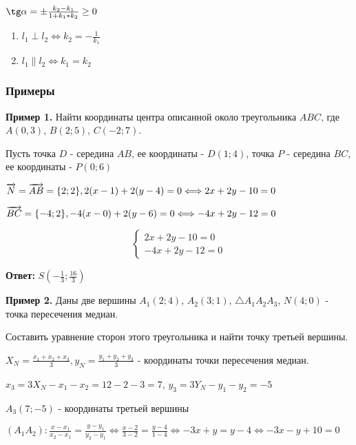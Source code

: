 \documentclass{article}
\def\vec{\ensuremath\overrightarrow}
\begin{document}
\begin{flushleft}
$\tg \alpha = \pm \frac{k_2 - k_1}{1 + k_1 * k_2} \ge 0$

\begin{enumerate}
    \item $l_1 \perp l_2 \Longleftrightarrow k_2 = -\frac{1}{k_1}$
    \item $l_1 \parallel l_2 \Longleftrightarrow k_1 = k_2$
\end{enumerate}

\subsubsection{Примеры}

\textbf{Пример 1.} Найти координаты центра описанной около треугольника $ABC$, где $A(0, 3)$, $B(2; 5)$, $C(-2; 7)$.

Пусть точка $D$ - середина $AB$, ее координаты - $D(1; 4)$, точка $P$ - середина $BC$, ее координаты - $P(0; 6)$

\hfill

$\vec{N} = \vec{AB} = \{ 2; 2 \}, 2(x - 1) + 2(y - 4) = 0 \Longleftrightarrow 2x + 2y - 10 = 0$

$\vec{BC} = \{ -4; 2 \}, -4(x - 0) + 2 (y - 6) = 0 \Longleftrightarrow -4x + 2y - 12 = 0$

\hfill

\begin{equation}
    \begin{cases}
        2x + 2y - 10 = 0 \\
        -4x + 2y - 12 = 0
    \end{cases}
\end{equation}

\textbf{Ответ:} $S(-\frac{1}{3}; \frac{16}{3})$

\hfill

\textbf{Пример 2.} Даны две вершины $A_1(2; 4)$, $A_2(3; 1)$, $\triangle A_1 A_2 A_3$, $N(4; 0)$ - точка пересечения медиан.

Составить уравнение сторон этого треугольника и найти точку третьей вершины.

\hfill

$X_N = \frac{x_1 + x_2 + x_3}{3}, y_N = \frac{y_1 + y_2 + y_3}{3}$ - координаты точки пересечения медиан.

$x_3 = 3X_N - x_1 - x_2 = 12 - 2 - 3 = 7$, $y_3 = 3Y_N - y_1 - y_2 = -5$

$A_3(7; -5)$ - координаты третьей вершины

\hfill

$(A_1 A_2): \frac{x - x_1}{x_2 - x_1} = \frac{y - y_1}{y_2 - y_1} \Longleftrightarrow \frac{x - 2}{3 - 2} = \frac{y - 4}{1 - 4} \Longleftrightarrow -3x + y = y - 4 \Longleftrightarrow -3x - y + 10 = 0$


\end{flushleft}
\end{document}
